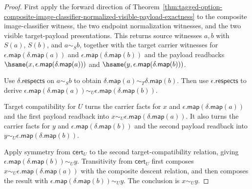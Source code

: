 \begin{proof}
First apply the forward direction of
Theorem~\ref{thm:tagged-option-composite-image-classifier-normalized-visible-payload-exactness}
to the composite image-classifier witness, the two endpoint normalization
witnesses, and the two visible target-payload presentations. This returns
source witnesses $a,b$ with $S(a)$, $S(b)$, and $a\sim_S b$, together with the
target carrier witnesses for
$\epsilon.\mathsf{map}(\delta.\mathsf{map}(a))$ and
$\epsilon.\mathsf{map}(\delta.\mathsf{map}(b))$ and the payload readbacks
$\hsame(x,\epsilon.\mathsf{map}(\delta.\mathsf{map}(a)))$ and
$\hsame(y,\epsilon.\mathsf{map}(\delta.\mathsf{map}(b)))$.

Use $\delta.\mathsf{respects}$ on $a\sim_S b$ to obtain
$\delta.\mathsf{map}(a)\sim_T\delta.\mathsf{map}(b)$. Then use
$\epsilon.\mathsf{respects}$ to derive
$\epsilon.\mathsf{map}(\delta.\mathsf{map}(a))
\sim_U
\epsilon.\mathsf{map}(\delta.\mathsf{map}(b))$.

Target compatibility for $U$ turns the carrier facts for $x$ and
$\epsilon.\mathsf{map}(\delta.\mathsf{map}(a))$ and the first payload readback
into
$x\sim_U\epsilon.\mathsf{map}(\delta.\mathsf{map}(a))$. It also turns the
carrier facts for $y$ and $\epsilon.\mathsf{map}(\delta.\mathsf{map}(b))$ and
the second payload readback into
$y\sim_U\epsilon.\mathsf{map}(\delta.\mathsf{map}(b))$.

Apply symmetry from $\mathsf{cert}_U$ to the second target-compatibility
relation, giving
$\epsilon.\mathsf{map}(\delta.\mathsf{map}(b))\sim_U y$. Transitivity from
$\mathsf{cert}_U$ first composes
$x\sim_U\epsilon.\mathsf{map}(\delta.\mathsf{map}(a))$ with the composite
descent relation, and then composes the result with
$\epsilon.\mathsf{map}(\delta.\mathsf{map}(b))\sim_U y$. The conclusion is
$x\sim_U y$.
\end{proof}

